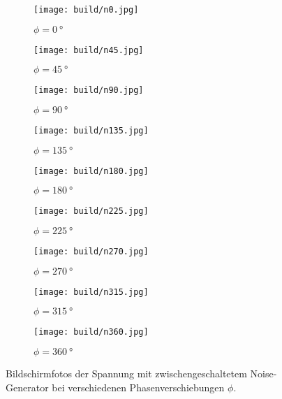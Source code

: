 \begin{figure}[H]
  \centering
  \begin{subfigure}{0.3\textwidth}
      \centering
      \texttt{[image: build/n0.jpg]}
      \caption{$\phi = \SI{0}{\degree}$}
  \end{subfigure}
  \begin{subfigure}{0.3\textwidth}
    \centering
    \texttt{[image: build/n45.jpg]}
    \caption{$\phi = \SI{45}{\degree}$}
  \end{subfigure}
  \begin{subfigure}{0.3\textwidth}
    \centering
    \texttt{[image: build/n90.jpg]}
    \caption{$\phi = \SI{90}{\degree}$}
  \end{subfigure}
  \begin{subfigure}{0.3\textwidth}
    \centering
    \texttt{[image: build/n135.jpg]}
    \caption{$\phi = \SI{135}{\degree}$}
  \end{subfigure}
  \begin{subfigure}{0.3\textwidth}
    \centering
    \texttt{[image: build/n180.jpg]}
    \caption{$\phi = \SI{180}{\degree}$}
  \end{subfigure}
  \begin{subfigure}{0.3\textwidth}
    \centering
    \texttt{[image: build/n225.jpg]}
    \caption{$\phi = \SI{225}{\degree}$}
  \end{subfigure}
  \begin{subfigure}{0.3\textwidth}
    \centering
    \texttt{[image: build/n270.jpg]}
    \caption{$\phi = \SI{270}{\degree}$}
  \end{subfigure}
  \begin{subfigure}{0.3\textwidth}
    \centering
    \texttt{[image: build/n315.jpg]}
    \caption{$\phi = \SI{315}{\degree}$}
  \end{subfigure}
  \begin{subfigure}{0.3\textwidth}
    \centering
    \texttt{[image: build/n360.jpg]}
    \caption{$\phi = \SI{360}{\degree}$}
  \end{subfigure}
  \caption{Bildschirmfotos der Spannung mit zwischengeschaltetem Noise-Generator bei verschiedenen Phasenverschiebungen $\phi$.}
  \label{fig:Oszilloskop2}
\end{figure}

